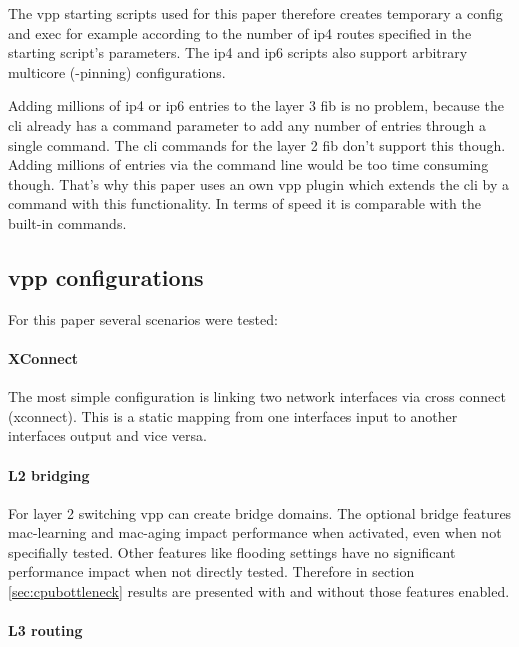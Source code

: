 The vpp starting scripts used for this paper therefore creates
temporary a \Ac{config} and \Ac{exec} for example according to the
number of \Ac{ip4} routes specified in the starting script's
parameters. The \Ac{ip4} and \Ac{ip6} scripts also support arbitrary
multicore (-pinning) configurations.


Adding millions of \Ac{ip4} or \Ac{ip6} entries to the layer 3
\Ac{fib} is no problem, because the \Ac{cli} already has a command
parameter to add any number of entries through a single command. The
\Ac{cli} commands for the layer 2 \Ac{fib} don't support this though.
Adding millions of entries via the command line would be too time
consuming though. That's why this paper uses an own \Ac{vpp} plugin
which extends the \Ac{cli} by a command with this functionality. In
terms of speed it is comparable with the built-in commands.


\subsection{\Ac{vpp} configurations}

For this paper several scenarios were tested: 

\paragraph{XConnect} 

The most simple configuration is linking two network interfaces via cross connect (xconnect). This is a static mapping from one interfaces input to another interfaces output and vice versa. 

\paragraph{L2 bridging}

For layer 2 switching \Ac{vpp} can create bridge domains. The optional
bridge features mac-learning and mac-aging impact performance when
activated, even when not specifially tested. Other features like
flooding settings have no significant performance impact when not
directly tested. Therefore in section \ref{sec:cpubottleneck} results
are presented with and without those features enabled.

\paragraph{L3 routing}

